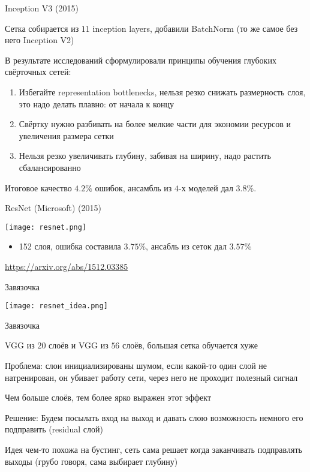 \documentclass[notes,12pt, aspectratio=169]{beamer}
\newenvironment{wideitemize}{\itemize\addtolength{\itemsep}{10pt}}{\enditemize}
\begin{document}
\begin{frame}{Inception V3 (2015)}
\begin{wideitemize}
\item  Сетка собирается из $11$ inception layers, добавили BatchNorm (то же самое без него Inception V2)

\item В результате исследований сформулировали принципы обучения глубоких свёрточных сетей: 

\begin{enumerate}
\item  Избегайте representation bottlenecks, нельзя резко снижать размерность слоя, это надо делать плавно: от начала к концу
\item Свёртку нужно разбивать на более мелкие части для экономии ресурсов и увеличения размера сетки 
\item Нельзя резко увеличивать глубину, забивая на ширину, надо растить сбалансированно
\end{enumerate} 

\item Итоговое качество $4.2\%$ ошибок, ансамбль из $4$-х моделей дал $3.8\%$. 
\end{wideitemize}
\end{frame}


\begin{frame}{ResNet (Microsoft) (2015)}
\begin{center}
\texttt{[image: resnet.png]}
\end{center}
\begin{itemize}
\item 152 слоя, ошибка составила $3.75\%$, ансабль из сеток дал $3.57\%$
\end{itemize}
\vfill %
\footnotesize
\color{blue} \url{https://arxiv.org/abs/1512.03385}
\end{frame}


\begin{frame}{Завязочка}
\begin{center}
\texttt{[image: resnet\_idea.png]}
\end{center}
\end{frame}


\begin{frame}{Завязочка}
\begin{wideitemize}
\item  VGG из $20$ слоёв и VGG из $56$ слоёв,  большая сетка обучается хуже
\item  \alert{Проблема:} слои инициализированы шумом, если какой-то один слой не натренирован, он убивает работу сети, через него не проходит полезный сигнал 
\item Чем больше слоёв, тем более ярко выражен этот эффект 
\item \alert{Решение:} Будем посылать вход на выход и давать слою возможность немного его подправить (residual слой)
\item Идея чем-то похожа на бустинг, сеть сама решает когда заканчивать подправлять выходы (грубо говоря, сама выбирает глубину)
\end{wideitemize}
\end{frame}
\end{document}
